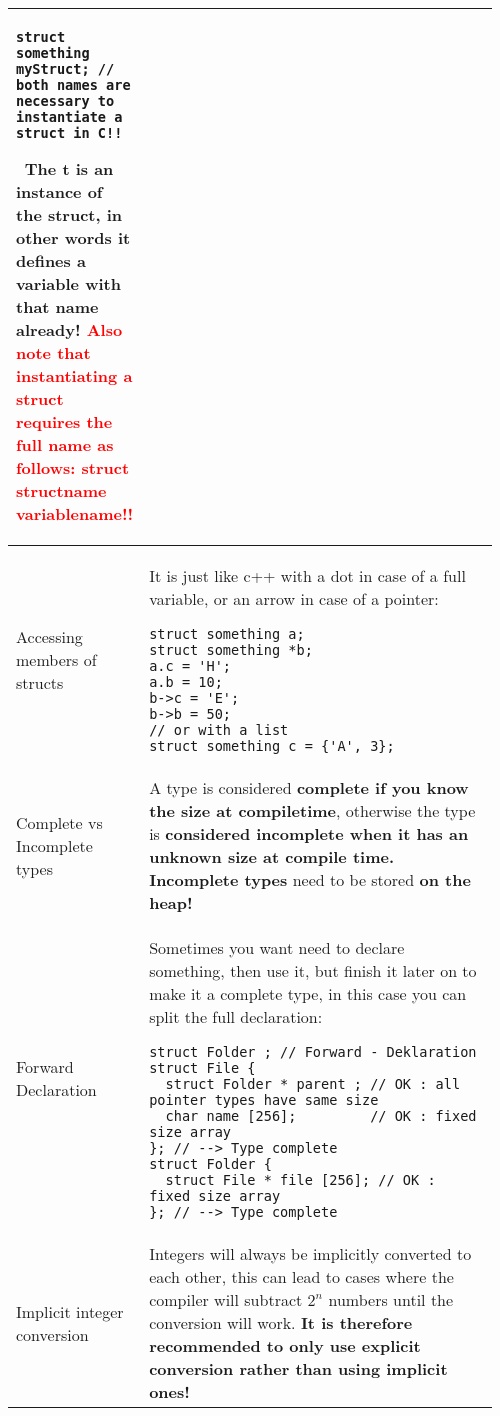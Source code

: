 \documentclass[main.tex,fontsize=8pt,paper=a4,paper=portrait,DIV=calc,]{scrartcl}
\begin{document}
\begin{table}[ht!]
\begin{tabular}{|m{0.2\linewidth}|m{0.755\linewidth}|}
\begin{lstlisting}
struct something myStruct; // both names are necessary to instantiate a struct in C!!
\end{lstlisting}
\, \newline
\textcolor{OliveGreen}{The \textbf{t is an instance of the struct, in other words it defines a variable with that name already!}}\newline
\textcolor{red}{Also note that instantiating a struct requires the full name as follows: \textbf{struct structname variablename}!!}\\
\hline
Accessing members of structs & 
It is just like c++ with a dot in case of a full variable, or an arrow in case of a pointer: \newline
\begin{lstlisting}
struct something a;
struct something *b;
a.c = 'H';
a.b = 10;
b->c = 'E';
b->b = 50; 
// or with a list 
struct something c = {'A', 3};
\end{lstlisting}\\
\hline
Complete vs Incomplete types & 
A type is considered \textbf{complete if you know the size at compiletime}, otherwise the type is \textbf{considered incomplete when it has an unknown size at compile time.}\newline
\textbf{Incomplete types} need to be stored \textbf{on the heap!}\\
\hline
Forward Declaration & 
Sometimes you want need to declare something, then use it, but finish it later on to make it a complete type, in this case you can split the full declaration:\newline
\begin{lstlisting}
struct Folder ; // Forward - Deklaration
struct File {
  struct Folder * parent ; // OK : all pointer types have same size
  char name [256];         // OK : fixed size array
}; // --> Type complete
struct Folder {
  struct File * file [256]; // OK : fixed size array
}; // --> Type complete
\end{lstlisting}\\
\hline
Implicit integer conversion & 
Integers will always be implicitly converted to each other, this can lead to cases where the compiler will subtract \(2^n\) numbers until the conversion will work.\newline
\textbf{It is therefore recommended to only use explicit conversion rather than using implicit ones!}\\
\hline
\end{tabular}
\end{table}
\pagebreak
\end{document}
